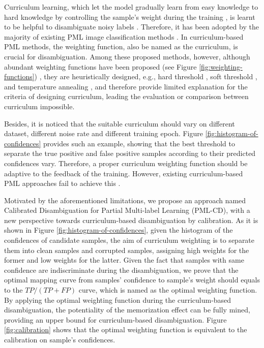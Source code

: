 \documentclass[letterpaper]{article} %
\begin{document}
  Curriculum learning, which let the model gradually learn from easy knowledge to hard knowledge by controlling the sample's weight during the training \cite{Curriculum-learning-2009}, is learnt to be helpful to disambiguate noisy labels \cite{MentorNet,LL-R}. Therefore, it has been adopted by the majority of existing PML image classification methods \cite{PML-CDCR,UNM}. 
  In curriculum-based PML methods, the weighting function, also be named as the curriculum, is crucial for disambiguation. 
  Among these proposed methods, however, although abundant weighting functions have been proposed (see Figure \ref{fig:weighting-functions}) \cite{Survey-curriculum-learning}, they are heuristically designed, e.g., hard threshold \cite{PML-CDCR}, soft threshold \cite{SoftMatch}, and temperature annealing \cite{Dash}, and therefore provide limited explanation for the criteria of designing curriculum, leading the evaluation or comparison between curriculum impossible.  

  Besides, it is noticed that the suitable curriculum should vary on different dataset, different noise rate and different training epoch. Figure \ref{fig:histogram-of-confidences} provides such an example, showing that the best threshold to separate the true positive and false positive samples according to their predicted confidences vary. Therefore, a proper curriculum weighting function should be adaptive to the feedback of the training. However, existing curriculum-based PML approaches fail to achieve this \cite{PML-CDCR,UNM}. 

  Motivated by the aforementioned limitations, we propose an approach named Calibrated Disambiguation for Partial Multi-label Learning (PML-CD), with a new perspective towards curriculum-based disambiguation by calibration. As it is shown in Figure \ref{fig:histogram-of-confidences}, given the histogram of the confidences of candidate samples, the aim of curriculum weighting is to separate them into clean samples and corrupted samples, assigning high weights for the former and low weights for the latter. 
  Given the fact that samples with same confidence are indiscriminate during the disambiguation, we prove that the optimal mapping curve from samples' confidence to sample's weight should equals to the $TP / (TP + FP)$ curve, which is named as the optimal weighting function. By applying the optimal weighting function during the curriculum-based disambiguation, the potentiality of the memorization effect can be fully mined, providing an upper bound for curriculum-based disambiguation. Figure \ref{fig:calibration} shows that the optimal weighting function is equivalent to the calibration on sample's confidences. 
\end{document}
